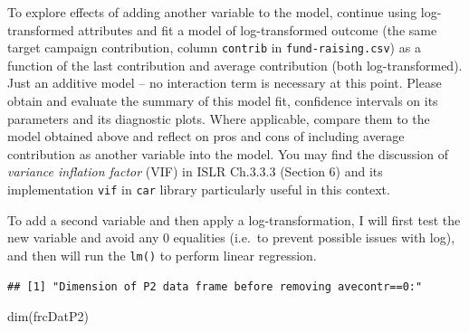 \documentclass[
]{article}
\newenvironment{Shaded}{\begin{snugshade}}{\end{snugshade}}
\newcommand{\CommentTok}[1]{\textcolor[rgb]{0.56,0.35,0.01}{\textit{#1}}}
\newcommand{\DecValTok}[1]{\textcolor[rgb]{0.00,0.00,0.81}{#1}}
\newcommand{\DocumentationTok}[1]{\textcolor[rgb]{0.56,0.35,0.01}{\textbf{\textit{#1}}}}
\newcommand{\FunctionTok}[1]{\textcolor[rgb]{0.00,0.00,0.00}{#1}}
\newcommand{\NormalTok}[1]{#1}
\newcommand{\OtherTok}[1]{\textcolor[rgb]{0.56,0.35,0.01}{#1}}
\newcommand{\SpecialCharTok}[1]{\textcolor[rgb]{0.00,0.00,0.00}{#1}}
\newcommand{\StringTok}[1]{\textcolor[rgb]{0.31,0.60,0.02}{#1}}
\begin{document}
To explore effects of adding another variable to the model, continue
using log-transformed attributes and fit a model of log-transformed
outcome (the same target campaign contribution, column \texttt{contrib}
in \texttt{fund-raising.csv}) as a function of the last contribution and
average contribution (both log-transformed). Just an additive model --
no interaction term is necessary at this point. Please obtain and
evaluate the summary of this model fit, confidence intervals on its
parameters and its diagnostic plots. Where applicable, compare them to
the model obtained above and reflect on pros and cons of including
average contribution as another variable into the model. You may find
the discussion of \emph{variance inflation factor} (VIF) in ISLR
Ch.3.3.3 (Section 6) and its implementation \texttt{vif} in \texttt{car}
library particularly useful in this context.

To add a second variable and then apply a log-transformation, I will
first test the new variable and avoid any 0 equalities (i.e.~to prevent
possible issues with log), and then will run the \texttt{lm()} to
perform linear regression.

\begin{Shaded}
\end{Shaded}

\begin{verbatim}
## [1] "Dimension of P2 data frame before removing avecontr==0:"
\end{verbatim}

\begin{Shaded}
\begin{Highlighting}[]
\FunctionTok{dim}\NormalTok{(frcDatP2)}
\end{Highlighting}
\end{Shaded}
\end{document}
